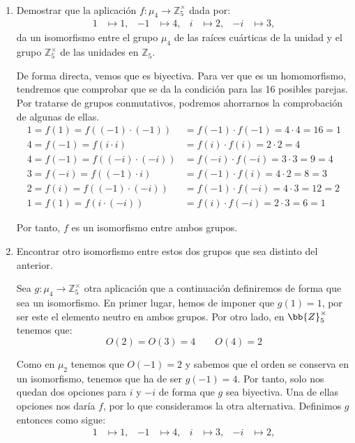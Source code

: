 \begin{ejercicio}\label{ej:2.26}~
    \begin{enumerate}
        \item Demostrar que la aplicación $f:\mu_4\to \mathbb{Z}^{\times}_5$ dada por:
        \begin{align*}
            1 &\mapsto 1, & -1 &\mapsto 4, & i &\mapsto 2, & -i &\mapsto 3,
        \end{align*}
        da un isomorfismo entre el grupo $\mu_4$ de las raíces cuárticas de la unidad y el grupo $\mathbb{Z}^{\times}_5$ de las unidades en $\mathbb{Z}_5$.

        De forma directa, vemos que es biyectiva. Para ver que es un homomorfismo, tendremos que comprobar que se da la condición para las 16 posibles parejas. Por tratarse de grupos conmutativos, podremos ahorrarnos la comprobación de algunas de ellas.
        \begin{align*}
            1=f(1)=f((-1)\cdot (-1))&= f(-1)\cdot f(-1)=4\cdot 4=16=1\\
            4=f(-1)=f(i\cdot i)&= f(i)\cdot f(i)=2\cdot 2=4\\
            4=f(-1)=f((-i)\cdot (-i))&= f(-i)\cdot f(-i)=3\cdot 3=9=4\\
            3=f(-i)=f((-1)\cdot i)&= f(-1)\cdot f(i)=4\cdot 2=8=3\\
            2=f(i)=f((-1)\cdot (-i))&= f(-1)\cdot f(-i)=4\cdot 3=12=2\\
            1=f(1)=f(i\cdot (-i))&= f(i)\cdot f(-i)=2\cdot 3=6=1
        \end{align*}

        Por tanto, $f$ es un isomorfismo entre ambos grupos.
        \item Encontrar otro isomorfismo entre estos dos grupos que sea distinto del anterior.
        
        Sea $g:\mu_4\to \mathbb{Z}^{\times}_5$ otra aplicación que a continuación definiremos de forma que sea un isomorfismo. En primer lugar, hemos de imponer que $g(1)=1$, por ser este el elemento neutro en ambos grupos. Por otro lado, en $\bb{Z}^{\times}_5$ tenemos que:
        \begin{equation*}
            O(2)=O(3)=4\qquad O(4)=2
        \end{equation*}

        Como en $\mu_2$ tenemos que $O(-1)=2$ y sabemos que el orden se conserva en un isomorfismo, tenemos que ha de ser $g(-1)=4$. Por tanto, solo nos quedan dos opciones para $i$ y $-i$ de forma que $g$ sea biyectiva. Una de ellas opciones nos daría $f$, por lo que consideramos la otra alternativa. Definimos $g$ entonces como sigue:
        \begin{align*}
            1 &\mapsto 1, & -1 &\mapsto 4, & i &\mapsto 3, & -i &\mapsto 2,
        \end{align*}


\end{enumerate}
\end{ejercicio}
